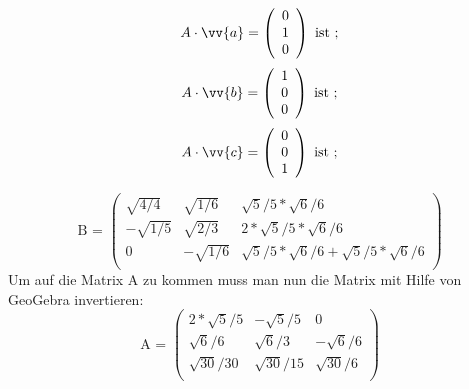      $$A\cdot \vv{a}=\left(\begin{array}{c} 
     0\\1\\0\end{array}\right)\mbox{ ist ;} $$
     $$A\cdot \vv{b}=\left(\begin{array}{c} 
     1\\0\\0\end{array}\right)\mbox{ ist ;} $$
     $$A\cdot \vv{c}=\left(\begin{array}{c} 
     0\\0\\1\end{array}\right)\mbox{ ist ;} $$
     
$$\mbox{B = } \left(\begin{array}{ccc}
\sqrt{4/4}&\sqrt{1/6}&\sqrt{5}/5*\sqrt{6}/6\\
-\sqrt{1/5}&\sqrt{2/3}&2*\sqrt{5}/5*\sqrt{6}/6\\
0&-\sqrt{1/6}&\sqrt{5}/5*\sqrt{6}/6+ \sqrt{5}/5*\sqrt{6}/6\\
\end{array}\right)$$
Um auf die Matrix A zu kommen muss man nun die Matrix mit Hilfe von GeoGebra invertieren:
$$\mbox{A = }\left(\begin{array}{ccc}
2*\sqrt{5}/5&-\sqrt{5}/5&0\\
\sqrt{6}/6&\sqrt{6}/3&-\sqrt{6}/6\\
\sqrt{30}/30&\sqrt{30}/15&\sqrt{30}/6\\
\end{array}\right)$$